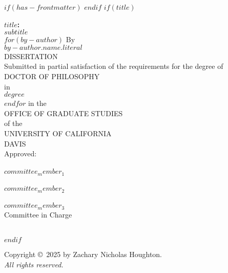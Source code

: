 $if(has-frontmatter)$
\frontmatter
$endif$
$if(title)$
\cleardoublepage
\thispagestyle{plain}
\begin{center}
   \null\vfill
   \textbf{%
      $title$:\\
	  $subtitle$
   }%
   \\
$for(by-author)$
   \bigskip
   By \\
   \bigskip
   {$by-author.name.literal$}
\\   
   DISSERTATION \\
   \bigskip
   Submitted in partial satisfaction of the requirements for the
   degree of \\
   \bigskip
   DOCTOR OF PHILOSOPHY \\
   \bigskip
   in \\
   \bigskip
   {$degree$} \\ 
   $endfor$
   \bigskip
   in the \\
   \bigskip
   OFFICE OF GRADUATE STUDIES \\
   \bigskip        
   of the \\
   \bigskip
   UNIVERSITY OF CALIFORNIA \\
   \bigskip
   DAVIS \\
   \bigskip
   Approved: \\
   \bigskip
   \bigskip
   \makebox[3in]{\hrulefill} \\
   $committee_member_1$ \\
   \bigskip
   \bigskip
   \makebox[3in]{\hrulefill} \\
   $committee_member_2$ \\
   \bigskip
   \bigskip
   \makebox[3in]{\hrulefill} \\
   $committee_member_3$ \\
   \bigskip
   Committee in Charge \\
    \\
   \vfill
\end{center}
$endif$


\newpage
{}
\setcounter{savedpage}{\value{page}}

\thispagestyle{empty}
\begin{titlepage}
\begin{center}
  Copyright \copyright\ 2025 by Zachary Nicholas Houghton. \\
  \textit{All rights reserved.}
\end{center}
\end{titlepage}

\setcounter{page}{\value{savedpage}} %
\clearpage
